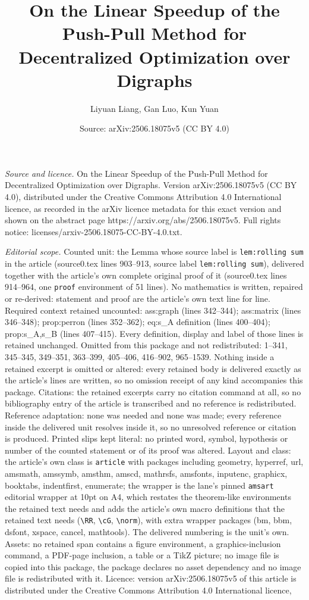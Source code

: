 \documentclass[10pt,a4paper]{amsart}
\title[On the Linear Speedup of the Push-Pull Method for Decentrali]{On the Linear Speedup of the Push-Pull Method for Decentralized Optimization over Digraphs}
\author{Liyuan Liang, Gan Luo, Kun Yuan}
\date{Source: arXiv:2506.18075v5 (CC BY 4.0)}
\begin{document}
\maketitle

\noindent\emph{Source and licence.} On the Linear Speedup of the Push-Pull Method for Decentralized Optimization over Digraphs. Version arXiv:2506.18075v5 (CC BY 4.0), distributed under the Creative Commons Attribution 4.0 International licence, as recorded in the arXiv licence metadata for this exact version and shown on the abstract page https://arxiv.org/abs/2506.18075v5. Full rights notice: licenses/arxiv-2506.18075-CC-BY-4.0.txt.\par\smallskip

\noindent\textit{Editorial scope.} Counted unit: the Lemma whose source label is \texttt{lem:rolling sum} in the article (source0.tex lines 903--913, source label \texttt{lem:rolling sum}), delivered together with the article's own complete original proof of it (source0.tex lines 914--964, one \texttt{proof} environment of 51 lines). No mathematics is written, repaired or re-derived: statement and proof are the article's own text line for line. Required context retained uncounted: ass:graph (lines 342--344); ass:matrix (lines 346--348); prop:perron (lines 352--362); eq:s\_A definition (lines 400--404); prop:s\_A,s\_B (lines 407--415). Every definition, display and label of those lines is retained unchanged. Omitted from this package and not redistributed: 1--341, 345--345, 349--351, 363--399, 405--406, 416--902, 965--1539. Nothing inside a retained excerpt is omitted or altered: every retained body is delivered exactly as the article's lines are written, so no omission receipt of any kind accompanies this package. Citations: the retained excerpts carry no citation command at all, so no bibliography entry of the article is transcribed and no reference is redistributed. Reference adaptation: none was needed and none was made; every reference inside the delivered unit resolves inside it, so no unresolved reference or citation is produced. Printed slips kept literal: no printed word, symbol, hypothesis or number of the counted statement or of its proof was altered. Layout and class: the article's own class is \texttt{article} with packages including geometry, hyperref, url, amsmath, amssymb, amsthm, amscd, mathrsfs, amsfonts, inputenc, graphicx, booktabs, indentfirst, enumerate; the wrapper is the lane's pinned \texttt{amsart} editorial wrapper at 10pt on A4, which restates the theorem-like environments the retained text needs and adds the article's own macro definitions that the retained text needs (\texttt{\textbackslash RR}, \texttt{\textbackslash cG}, \texttt{\textbackslash norm}), with extra wrapper packages (bm, bbm, dsfont, xspace, cancel, mathtools). The delivered numbering is the unit's own. Assets: no retained span contains a figure environment, a graphics-inclusion command, a PDF-page inclusion, a table or a TikZ picture; no image file is copied into this package, the package declares no asset dependency and no image file is redistributed with it. Licence: version arXiv:2506.18075v5 of this article is distributed under the Creative Commons Attribution 4.0 International licence, 
\end{document}
